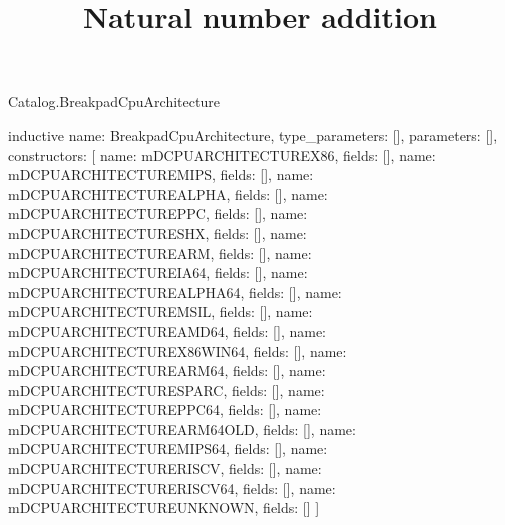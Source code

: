 \begin{lexlean}{Catalog.BreakpadCpuArchitecture}
\title{Natural number addition}
\begin{semanticmodule}
inductive{
  name: BreakpadCpuArchitecture,
  type_parameters: [],
  parameters: [],
  constructors: [
    {name: mDCPUARCHITECTUREX86, fields: []},
    {name: mDCPUARCHITECTUREMIPS, fields: []},
    {name: mDCPUARCHITECTUREALPHA, fields: []},
    {name: mDCPUARCHITECTUREPPC, fields: []},
    {name: mDCPUARCHITECTURESHX, fields: []},
    {name: mDCPUARCHITECTUREARM, fields: []},
    {name: mDCPUARCHITECTUREIA64, fields: []},
    {name: mDCPUARCHITECTUREALPHA64, fields: []},
    {name: mDCPUARCHITECTUREMSIL, fields: []},
    {name: mDCPUARCHITECTUREAMD64, fields: []},
    {name: mDCPUARCHITECTUREX86WIN64, fields: []},
    {name: mDCPUARCHITECTUREARM64, fields: []},
    {name: mDCPUARCHITECTURESPARC, fields: []},
    {name: mDCPUARCHITECTUREPPC64, fields: []},
    {name: mDCPUARCHITECTUREARM64OLD, fields: []},
    {name: mDCPUARCHITECTUREMIPS64, fields: []},
    {name: mDCPUARCHITECTURERISCV, fields: []},
    {name: mDCPUARCHITECTURERISCV64, fields: []},
    {name: mDCPUARCHITECTUREUNKNOWN, fields: []}
  ]
}
\end{semanticmodule}
\end{lexlean}
